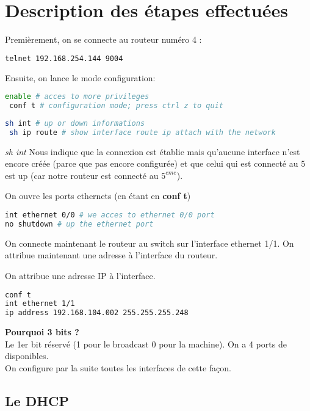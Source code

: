 \documentclass[10pt,a4paper]{article}
\begin{document}
\section{Description des étapes effectuées}

\noindent Premièrement, on se connecte au routeur numéro 4 :
\begin{lstlisting}[language=bash]
 telnet 192.168.254.144 9004
\end{lstlisting}

\noindent Ensuite, on lance le mode configuration:
\begin{lstlisting}[language=bash]
 enable # acces to more privileges
 conf t # configuration mode; press ctrl z to quit 
\end{lstlisting}

\begin{lstlisting}[language=bash]
 sh int # up or down informations
 sh ip route # show interface route ip attach with the network
\end{lstlisting}

\textit{sh int} Nous indique que la connexion est établie mais qu'aucune interface n'est encore créée (parce que pas encore configurée) et que celui qui est connecté au $5$ est up (car notre routeur est connecté au $5^{eme}$).

\noindent On ouvre les ports ethernets (en étant en \textbf{conf t})
\begin{lstlisting}[language=bash]
int ethernet 0/0 # we acces to ethernet 0/0 port
no shutdown # up the ethernet port
\end{lstlisting}

On connecte maintenant le routeur au switch sur l'interface ethernet 1/1. On attribue maintenant une adresse à l'interface du routeur.

\noindent On attribue une adresse IP à l'interface.
\begin{lstlisting}[language=bash]
conf t
int ethernet 1/1
ip address 192.168.104.002 255.255.255.248
\end{lstlisting}
\textbf{Pourquoi 3 bits ?}\\
Le 1er bit réservé (1 pour le broadcast 0 pour la machine). On a 4 ports de disponibles.\\
On configure par la suite toutes les interfaces de cette façon.

\subsection{Le DHCP}
\end{document}
